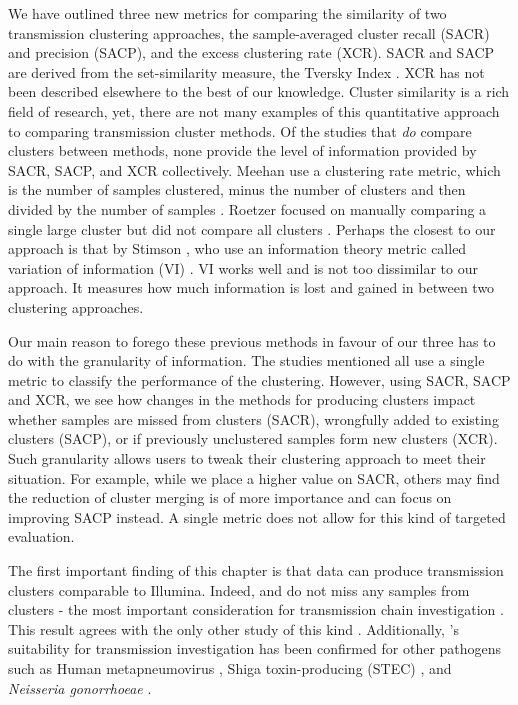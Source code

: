 We have outlined three new metrics for comparing the similarity of two transmission clustering approaches, the sample-averaged cluster recall (SACR) and precision (SACP), and the excess clustering rate (XCR). SACR and SACP are derived from the set-similarity measure, the Tversky Index \cite{tversky1977}. XCR has not been described elsewhere to the best of our knowledge. Cluster similarity is a rich field of research, yet, there are not many examples of this quantitative approach to comparing transmission cluster methods. Of the studies that \emph{do} compare clusters between methods, none provide the level of information provided by SACR, SACP, and XCR collectively. Meehan \etal{} use a clustering rate metric, which is the number of samples clustered, minus the number of clusters and then divided by the number of samples \cite{meehan2018}. Roetzer \etal{} focused on manually comparing a single large cluster but did not compare all clusters \cite{roetzer2013}. Perhaps the closest to our approach is that by Stimson \etal{} \cite{stimson2019}, who use an information theory metric called variation of information (VI) \cite{meila2007}. VI works well and is not too dissimilar to our approach. It measures how much information is lost and gained in between two clustering approaches.

Our main reason to forego these previous methods in favour of our three has to do with the granularity of information. The studies mentioned all use a single metric to classify the performance of the clustering. However, using SACR, SACP and XCR, we see how changes in the methods for producing clusters impact whether samples are missed from clusters (SACR), wrongfully added to existing clusters (SACP), or if previously unclustered samples form new clusters (XCR). Such granularity allows users to tweak their clustering approach to meet their situation. For example, while we place a higher value on SACR, others may find the reduction of cluster merging is of more importance and can focus on improving SACP instead. A single metric does not allow for this kind of targeted evaluation.

The first important finding of this chapter is that \ont{} data can produce transmission clusters comparable to Illumina. Indeed, \bcftools{} and \compare{} do not miss any samples from clusters - the most important consideration for transmission chain investigation \cite{walker2013}. This result agrees with the only other \mtb{} study of this kind \cite{smith2020}. Additionally, \ont{}'s suitability for transmission investigation has been confirmed for other pathogens such as Human metapneumovirus \cite{xu2020}, Shiga toxin-producing \ecoli{} (STEC) \cite{greig2021}, and \textit{Neisseria gonorrhoeae} \cite{sanderson2020}.

